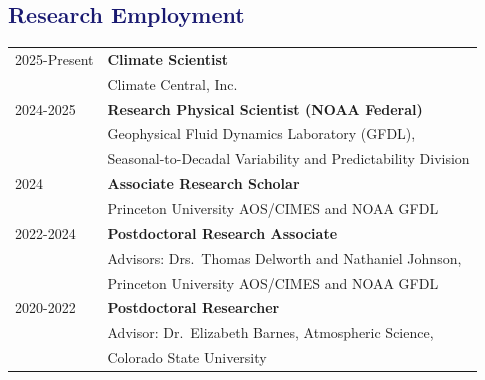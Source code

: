 \documentclass[margin,line,palatino,courier,10pt]{res}
\begin{document}
\begin{resume}
\section{\sc \textcolor{MidnightBlue}{\large{\textbf{Research Employment}}}}
\vspace*{0.05in}
\begin{tabular}{@{}p{0.9in}p{4in}}
2025-Present & \textbf{Climate Scientist}\\
& \hspace{0.2in} Climate Central, Inc.\\

2024-2025 & \textbf{Research Physical Scientist (NOAA Federal)}\\
& \hspace{0.2in} Geophysical Fluid Dynamics Laboratory (GFDL),\\
& \vspace{-0.18in}\hspace{0.2in} Seasonal-to-Decadal Variability and Predictability Division\\

2024 & \textbf{Associate Research Scholar}\\
& \hspace{0.2in} Princeton University AOS/CIMES and NOAA GFDL\\

2022-2024 & \textbf{Postdoctoral Research Associate}\\
& \hspace{0.2in} Advisors: Drs.\ Thomas Delworth and Nathaniel Johnson,\\
& \vspace{-0.18in}\hspace{0.2in} Princeton University AOS/CIMES and NOAA GFDL\\

2020-2022 & \textbf{Postdoctoral Researcher}\\
& \hspace{0.2in} Advisor: Dr.\ Elizabeth Barnes, Atmospheric Science,\\
& \vspace{-0.18in}\hspace{0.2in} Colorado State University\\


\end{tabular}
\end{resume}
\end{document}
